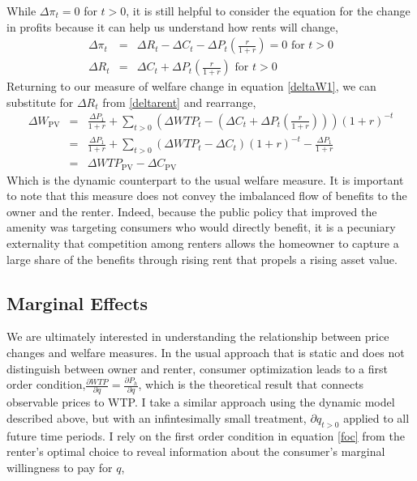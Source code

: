 \documentclass[ecta,nameyear,draft]{econsocart}
\theoremstyle{plain}
\theoremstyle{remark}
\begin{document}
While $\Delta\pi_t=0$ for $t>0$, it is still helpful to consider the equation for the change in profits because it can help us understand how rents will change,
\begin{eqnarray}
	\Delta \pi_t &=& \Delta R_t-\Delta C_t-\Delta P_t\left(\frac{r}{1+r}\right)=0 \text{ for } t>0\nonumber\\
	\Delta R_t &=& \Delta C_t+\Delta P_t \left(\frac{r}{1+r}\right)  \text{ for } t>0\label{deltarent}
\end{eqnarray}
Returning to our measure of welfare change in equation \ref{deltaW1}, we can substitute for $\Delta R_t$  from \ref{deltarent} and rearrange,
\begin{eqnarray}
	\Delta W_{\mathrm{PV}}&=&\frac{\Delta P_1}{1+r}+\sum_{t>0} \left(\Delta \mathit{WTP}_t-\left(\Delta C_t+\Delta P_t \left(\frac{r}{1+r}\right)\right)\right)(1+r)^{-t} \nonumber\\
	&=&\frac{\Delta P_1}{1+r}+\sum_{t>0} (\Delta \mathit{WTP}_t-\Delta C_t)(1+r)^{-t}-\frac{\Delta P_1}{1+r}\nonumber\\
	&=&\Delta \mathit{WTP}_{\mathrm{PV}}-\Delta C_{\mathrm{PV}} \label{deltaW2}
\end{eqnarray}
Which is the dynamic counterpart to the usual welfare measure. It is important to note that this measure does not convey the imbalanced flow of benefits to the owner and the renter. Indeed, because the public policy that improved the amenity was targeting consumers who would directly benefit, it is a pecuniary externality that competition among renters allows the homeowner to capture a large share of the benefits through rising rent that propels a rising asset value.

\subsection{Marginal Effects}
We are ultimately interested in understanding the relationship between price changes and welfare measures. In the usual approach that is static and does not distinguish between owner and renter, consumer optimization leads to a first order condition,$\frac{\partial{\mathit{WTP}}}{\partial q}=\frac{\partial P_h}{\partial q}$, which is the theoretical result that connects observable prices to WTP. I take a similar approach using the dynamic model described above, but with an infintesimally small treatment, $\partial q_{t>0}$ applied to all future time periods. I rely on the first order condition in equation \ref{foc} from the renter's optimal choice to reveal information about the consumer's marginal willingness to pay for $q$,
\end{document}
